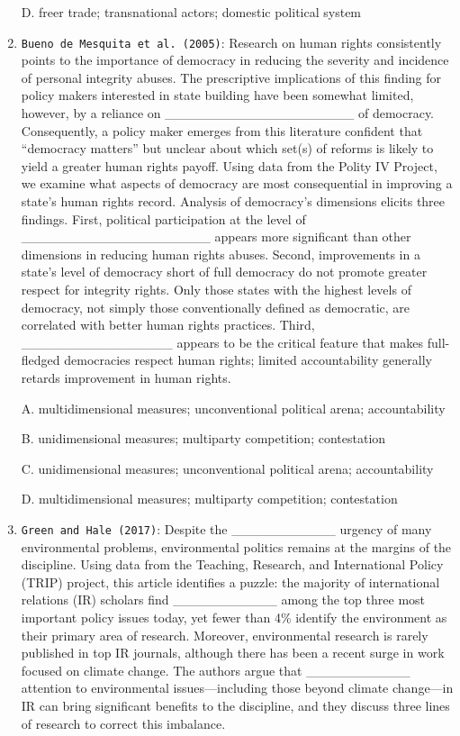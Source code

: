 \documentclass[
]{book}
\begin{document}
\begin{enumerate}
  D. freer trade; transnational actors; domestic political system
\item
  \texttt{Bueno\ de\ Mesquita\ et\ al.\ (2005)}: Research on human rights consistently points to the importance of democracy in reducing the severity and incidence of personal integrity abuses. The prescriptive implications of this finding for policy makers interested in state building have been somewhat limited, however, by a reliance on \_\_\_\_\_\_\_\_\_\_\_\_\_\_\_\_\_\_\_\_ of democracy. Consequently, a policy maker emerges from this literature confident that ``democracy matters'' but unclear about which set(s) of reforms is likely to yield a greater human rights payoff. Using data from the Polity IV Project, we examine what aspects of democracy are most consequential in improving a state's human rights record. Analysis of democracy's dimensions elicits three findings. First, political participation at the level of \_\_\_\_\_\_\_\_\_\_\_\_\_\_\_\_\_\_\_\_ appears more significant than other dimensions in reducing human rights abuses. Second, improvements in a state's level of democracy short of full democracy do not promote greater respect for integrity rights. Only those states with the highest levels of democracy, not simply those conventionally defined as democratic, are correlated with better human rights practices. Third, \_\_\_\_\_\_\_\_\_\_\_\_\_\_\_\_ appears to be the critical feature that makes full-fledged democracies respect human rights; limited accountability generally retards improvement in human rights.

  A. multidimensional measures; unconventional political arena; accountability

  B. unidimensional measures; multiparty competition; contestation

  C. unidimensional measures; unconventional political arena; accountability

  D. multidimensional measures; multiparty competition; contestation
\item
  \texttt{Green\ and\ Hale\ (2017)}: Despite the \_\_\_\_\_\_\_\_\_\_\_ urgency of many environmental problems, environmental politics remains at the margins of the discipline. Using data from the Teaching, Research, and International Policy (TRIP) project, this article identifies a puzzle: the majority of international relations (IR) scholars find \_\_\_\_\_\_\_\_\_\_\_ among the top three most important policy issues today, yet fewer than 4\% identify the environment as their primary area of research. Moreover, environmental research is rarely published in top IR journals, although there has been a recent surge in work focused on climate change. The authors argue that \_\_\_\_\_\_\_\_\_\_\_ attention to environmental issues---including those beyond climate change---in IR can bring significant benefits to the discipline, and they discuss three lines of research to correct this imbalance.


\end{enumerate}
\end{document}
